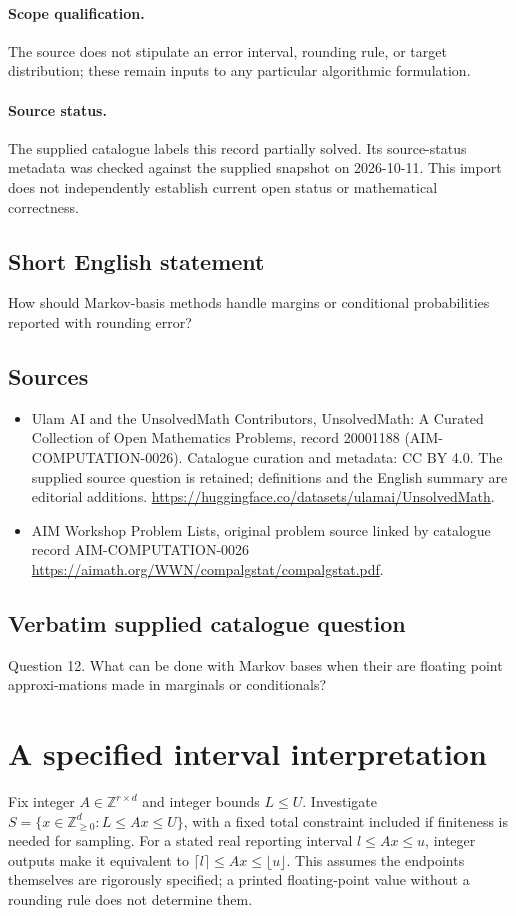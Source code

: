 \documentclass[11pt]{article}
\begin{document}
\paragraph{Scope qualification.}
The source does not stipulate an error interval, rounding rule, or target distribution; these remain inputs to any particular algorithmic formulation.
\paragraph{Source status.}
The supplied catalogue labels this record partially solved. Its source-status metadata was checked against the supplied snapshot on 2026-10-11. This import does not independently establish current open status or mathematical correctness.
\subsection{Short English statement}
How should Markov-basis methods handle margins or conditional probabilities reported with rounding error?
\subsection{Sources}
\begin{itemize}
\item[S1] Ulam AI and the UnsolvedMath Contributors, UnsolvedMath: A Curated Collection of Open Mathematics Problems, record 20001188 (AIM-COMPUTATION-0026). Catalogue curation and metadata: CC BY 4.0. The supplied source question is retained; definitions and the English summary are editorial additions.
\url{https://huggingface.co/datasets/ulamai/UnsolvedMath}.
\item[S2] AIM Workshop Problem Lists, original problem source linked by catalogue record AIM-COMPUTATION-0026
\url{https://aimath.org/WWN/compalgstat/compalgstat.pdf}.
\end{itemize}
\subsection{Verbatim supplied catalogue question}
Question 12. What can be done with Markov bases when their are floating point approxi-mations made in marginals or conditionals?

\section{A specified interval interpretation}
Fix integer $A\in\mathbb Z^{r\times d}$ and integer bounds $L\le U$.
Investigate $S=\{x\in\mathbb Z_{\ge0}^d:L\le Ax\le U\}$, with a
fixed total constraint included if finiteness is needed for sampling.
For a stated real reporting interval $l\le Ax\le u$, integer outputs
make it equivalent to $\lceil l\rceil\le Ax\le\lfloor u\rfloor$.
This assumes the endpoints themselves are rigorously specified; a printed
floating-point value without a rounding rule does not determine them.
\end{document}
